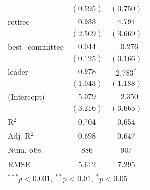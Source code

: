 \documentclass[12pt]{article}
\begin{document}
\begin{table}
\begin{center}
\begin{tabular}{l c c }
			& $(0.595)$      & $(0.750)$     \\
			retiree                  & $0.933$        & $4.791$       \\
			& $(2.569)$      & $(3.669)$     \\
			best\_committee          & $0.044$        & $-0.276$      \\
			& $(0.125)$      & $(0.166)$     \\
			leader                   & $0.978$        & $2.783^{*}$   \\
			& $(1.043)$      & $(1.188)$     \\
			(Intercept)              & $5.079$        & $-2.350$      \\
			& $(3.216)$      & $(3.665)$     \\
			\hline
			R$^2$                    & 0.704          & 0.654         \\
			Adj. R$^2$               & 0.698          & 0.647         \\
			Num. obs.                & 886            & 907           \\
			RMSE                     & 5.612          & 7.295         \\
			\hline
			\multicolumn{3}{l}{\scriptsize{$^{***}p<0.001$, $^{**}p<0.01$, $^*p<0.05$}}
		\end{tabular}
	\end{center}
\end{table}
\end{document}
